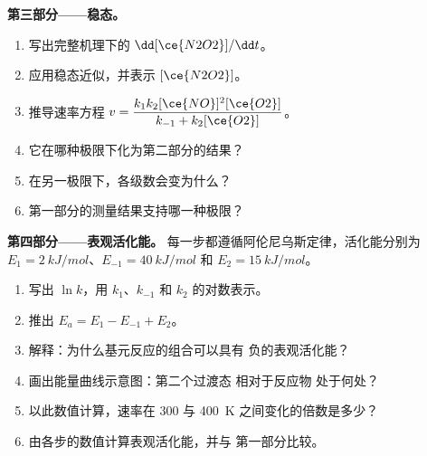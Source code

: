 \begin{problem}
\medskip
\noindent\textbf{第三部分——稳态。}
\begin{enumerate}[resume]
  \item 写出完整机理下的 $\dd[\ce{N2O2}]/\dd t$。
  \item 应用稳态近似，并表示 $[\ce{N2O2}]$。
  \item 推导速率方程 $v = \dfrac{k_1k_2[\ce{NO}]^2[\ce{O2}]}{k_{-1} +
        k_2[\ce{O2}]}$。
  \item 它在哪种极限下化为第二部分的结果？
  \item 在另一极限下，各级数会变为什么？
  \item 第一部分的测量结果支持哪一种极限？
\end{enumerate}

\medskip
\noindent\textbf{第四部分——表观活化能。}
每一步都遵循阿伦尼乌斯定律，活化能分别为 $E_1 =
\qty{2}{kJ/mol}$、$E_{-1} = \qty{40}{kJ/mol}$ 和 $E_2 =
\qty{15}{kJ/mol}$。
\begin{enumerate}[resume]
  \item 写出 $\ln k$，用 $k_1$、$k_{-1}$ 和
        $k_2$ 的对数表示。
  \item 推出 $E_a = E_1 - E_{-1} + E_2$。
  \item 解释：为什么基元反应的组合可以具有
        负的表观活化能？
  \item 画出能量曲线示意图：第二个过渡态
        相对于反应物  处于何处？
  \item 以此数值计算，速率在 300 与
        \qty{400}{K} 之间变化的倍数是多少？
  \item 由各步的数值计算表观活化能，并与
        第一部分比较。
\end{enumerate}
\end{problem}
